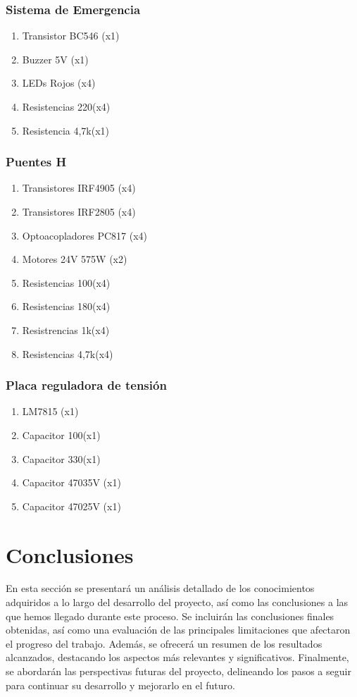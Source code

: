 \documentclass{article}
\begin{document}
\subsubsection{Sistema de Emergencia}
\begin{enumerate}
    \item Transistor BC546 (x1)
    \item Buzzer 5V (x1)
    \item LEDs Rojos (x4)
    \item Resistencias 220\Ω (x4)
    \item Resistencia 4,7k\Ω (x1)
\end{enumerate}

\subsubsection{Puentes H}
\begin{enumerate}
    \item Transistores IRF4905 (x4)
    \item Transistores IRF2805 (x4)
    \item Optoacopladores PC817 (x4)
    \item Motores 24V 575W (x2)
    \item Resistencias 100\Ω (x4)
    \item Resistencias 180\Ω (x4)
    \item Resistrencias 1k\Ω (x4)
    \item Resistencias 4,7k\Ω (x4)
\end{enumerate}

\subsubsection{Placa reguladora de tensión}
\begin{enumerate}
    \item LM7815 (x1)
    \item Capacitor 100 (x1)
    \item Capacitor 330 (x1)
    \item Capacitor 470 35V (x1)
    \item Capacitor 470 25V (x1)
\end{enumerate}

\section{Conclusiones}
En esta sección se presentará un análisis detallado de los conocimientos adquiridos a lo largo del desarrollo del proyecto, así como las conclusiones a las que hemos llegado durante este proceso. Se incluirán las conclusiones finales obtenidas, así como una evaluación de las principales limitaciones que afectaron el progreso del trabajo. Además, se ofrecerá un resumen de los resultados alcanzados, destacando los aspectos más relevantes y significativos. Finalmente, se abordarán las perspectivas futuras del proyecto, delineando los pasos a seguir para continuar su desarrollo y mejorarlo en el futuro.
\end{document}
